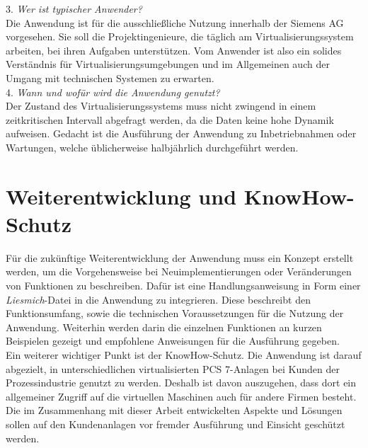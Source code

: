 3. \textit{Wer ist typischer Anwender?}\\
Die Anwendung ist für die ausschließliche Nutzung innerhalb der Siemens AG vorgesehen. Sie soll die Projektingenieure, die täglich am Virtualisierungssystem arbeiten, bei ihren Aufgaben unterstützen. Vom Anwender ist also ein solides Verständnis für Virtualisierungsumgebungen und im Allgemeinen auch der Umgang mit technischen Systemen zu erwarten.\medskip\\
4. \textit{Wann und wofür wird die Anwendung genutzt?}\\
Der Zustand des Virtualisierungssystems muss nicht zwingend in einem zeitkritischen Intervall abgefragt werden, da die Daten keine hohe Dynamik aufweisen. Gedacht ist die Ausführung der Anwendung zu Inbetriebnahmen oder Wartungen, welche üblicherweise halbjährlich durchgeführt werden.
\section{Weiterentwicklung und KnowHow-Schutz}
Für die zukünftige Weiterentwicklung der Anwendung muss ein Konzept erstellt werden, um die Vorgehensweise bei Neuimplementierungen oder Veränderungen von Funktionen zu beschreiben. Dafür ist eine Handlungsanweisung in Form einer \textit{Liesmich}-Datei in die Anwendung zu integrieren. Diese beschreibt den Funktionsumfang, sowie die technischen Voraussetzungen für die Nutzung der Anwendung. Weiterhin werden darin die einzelnen Funktionen an kurzen Beispielen gezeigt und empfohlene Anweisungen für die Ausführung gegeben.\medskip\\
Ein weiterer wichtiger Punkt ist der KnowHow-Schutz. Die Anwendung ist darauf abgezielt, in unterschiedlichen virtualisierten PCS 7-Anlagen bei Kunden der Prozessindustrie genutzt zu werden. Deshalb ist davon auszugehen, dass dort ein allgemeiner Zugriff auf die virtuellen Maschinen auch für andere Firmen besteht. Die im Zusammenhang mit dieser Arbeit entwickelten Aspekte und Lösungen sollen auf den Kundenanlagen vor fremder Ausführung und Einsicht geschützt werden.\newpage
